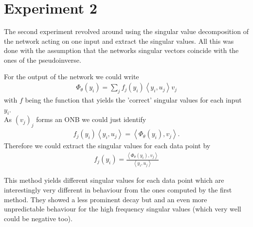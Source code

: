 \documentclass{article}
\begin{document}
\section*{Experiment 2}
The second experiment revolved around using the singular value decomposition of the network acting on one input and extract the singular values. All this was done with the assumption that the networks singular vectors coincide with the ones of the pseudoinverse.\\
\par
For the output of the network we could write
\begin{align*}
\Phi_\theta (y_i) = \sum_j f_j(y_i) \left\langle y_i, u_j \right\rangle v_j
\end{align*}
with $f$ being the function that yields the 'correct' singular values for each input $y_i$.\\
As $(v_j)_j$ forms an ONB we could just identify
\begin{align*}
f_j(y_i) \left\langle y_i, u_j \right\rangle = \left\langle\Phi_\theta(y_i),v_j\right\rangle.
\end{align*}
Therefore we could extract the singular values for each data point by
\begin{align*}
f_j(y_i) = \frac{\left\langle\Phi_\theta(y_i),v_j\right\rangle}{\left\langle y_i, u_j \right\rangle}
\end{align*}

This method yields different singular values for each data point which are interestingly very different in behaviour from the ones computed by the first method. They showed a less prominent decay but and an even more unpredictable behaviour for the high frequency singular values (which very well could be negative too).
\end{document}
